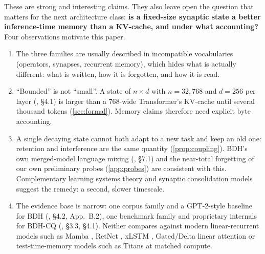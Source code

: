 \documentclass[11pt]{article}
\theoremstyle{remark}
\begin{document}
These are strong and interesting claims. They also leave open the question that matters for the next
architecture class: \textbf{is a fixed-size synaptic state a better inference-time memory than a KV-cache, and
under what accounting?} Four observations motivate this paper.
\begin{enumerate}[leftmargin=*,itemsep=1pt]
\item The three families are usually described in incompatible vocabularies (operators, synapses, recurrent
memory), which hides what is actually different: what is written, how it is forgotten, and how it is read.
\item ``Bounded'' is not ``small''. A state of $n\times d$ with $n=32{,}768$ and $d=256$ per layer
(\citealp{kosowski2025bdh}, \S4.1) is larger than a 768-wide Transformer's KV-cache until several thousand tokens
(\cref{sec:formal}). Memory claims therefore need explicit byte accounting.
\item A single decaying state cannot both adapt to a new task and keep an old one: retention and interference are
the same quantity (\cref{prop:coupling}). BDH's own merged-model language mixing
(\citealp{kosowski2025bdh}, \S7.1) and the near-total forgetting of our own preliminary probes
(\cref{app:probes}) are consistent with this. Complementary learning systems theory
\citep{mcclelland1995cls,kumaran2016cls} and synaptic consolidation models \citep{fusi2005cascade,benna2016consolidation}
suggest the remedy: a second, slower timescale.
\item The evidence base is narrow: one corpus family and a GPT-2-style baseline for BDH
(\citealp{kosowski2025bdh}, \S4.2, App.~B.2), one benchmark family and proprietary internals for BDH-CQ
(\citealp{engdahl2026bdhcq}, \S3.3, \S4.1). Neither compares against modern linear-recurrent models such as
Mamba \citep{gu2023mamba}, RetNet \citep{sun2023retnet}, xLSTM \citep{beck2024xlstm}, Gated/Delta linear attention
\citep{yang2024gla,yang2024deltanet,yang2025gateddelta} or test-time-memory models such as Titans
\citep{behrouz2025titans} at matched compute.
\end{enumerate}
\end{document}
